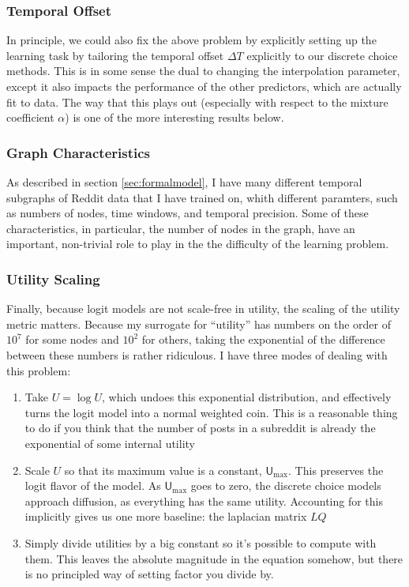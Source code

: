 \documentclass{article}
\theoremstyle{definition}
\begin{document}
	\subsubsection{Temporal Offset}
	In principle, we could also fix the above problem by explicitly setting up the learning task by tailoring the temporal offset $\Delta T$ explicitly to our discrete choice methods. This is in some sense the dual to changing the interpolation parameter, except it also impacts the performance of the other predictors, which are actually fit to data. The way that this plays out (especially with respect to the mixture coefficient $\alpha$) is one of the more interesting results below.
	
	\subsubsection{Graph Characteristics}
	As described in section \ref{sec:formalmodel}, I have many different temporal subgraphs of Reddit data that I have trained on, whith different paramters, such as numbers of nodes, time windows, and temporal precision. Some of these characteristics, in particular, the number of nodes in the graph, have an important, non-trivial role to play in the the difficulty of the learning problem. 
	
	\subsubsection{Utility Scaling}
	Finally, because logit models are not scale-free in utility, the scaling of the utility metric matters. Because my surrogate for ``utility'' has numbers on the order of $10^7$ for some nodes and $10^2$ for others, taking the exponential of the difference between these numbers is rather ridiculous. I have three modes of dealing with this problem:
	\begin{enumerate}
		\item Take $U = \log U$, which undoes this exponential distribution, and effectively turns the logit model into a normal weighted coin. This is a reasonable thing to do if you think that the number of posts in a subreddit is already the exponential of some internal utility
		\item Scale $U$ so that its maximum value is a constant, $\mathsf U_{\text{max}}$. This preserves the logit flavor of the model. As $\mathsf U_{\text{max}}$ goes to zero, the discrete choice models approach diffusion, as everything has the same utility. Accounting for this implicitly gives us one more baseline: the laplacian matrix $LQ$
		\item Simply divide utilities by a big constant so it's possible to compute with them. This leaves the absolute magnitude in the equation somehow, but there is no principled way of setting factor you divide by.
	\end{enumerate}
	
\end{document}
